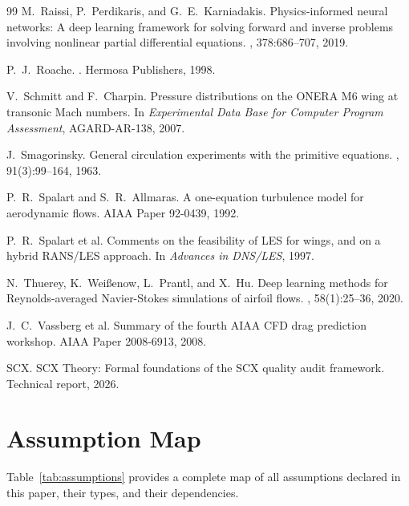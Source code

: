 \documentclass[11pt,a4paper]{article}
\theoremstyle{definition}
\theoremstyle{remark}
\begin{document}
\begin{thebibliography}{99}
M.~Raissi, P.~Perdikaris, and G.~E.~Karniadakis.
\newblock Physics-informed neural networks: A deep learning framework for solving forward and inverse problems involving nonlinear partial differential equations.
, 378:686--707, 2019.

P.~J.~Roache.
.
\newblock Hermosa Publishers, 1998.

V.~Schmitt and F.~Charpin.
\newblock Pressure distributions on the ONERA M6 wing at transonic Mach numbers.
\newblock In {\em Experimental Data Base for Computer Program Assessment}, AGARD-AR-138, 2007.

J.~Smagorinsky.
\newblock General circulation experiments with the primitive equations.
, 91(3):99--164, 1963.

P.~R.~Spalart and S.~R.~Allmaras.
\newblock A one-equation turbulence model for aerodynamic flows.
\newblock AIAA Paper 92-0439, 1992.

P.~R.~Spalart et al.
\newblock Comments on the feasibility of LES for wings, and on a hybrid RANS/LES approach.
\newblock In {\em Advances in DNS/LES}, 1997.

N.~Thuerey, K.~Weißenow, L.~Prantl, and X.~Hu.
\newblock Deep learning methods for Reynolds-averaged Navier-Stokes simulations of airfoil flows.
, 58(1):25--36, 2020.

J.~C.~Vassberg et al.
\newblock Summary of the fourth AIAA CFD drag prediction workshop.
\newblock AIAA Paper 2008-6913, 2008.

SCX.
\newblock SCX Theory: Formal foundations of the SCX quality audit framework.
\newblock Technical report, 2026.

\end{thebibliography}

\appendix
\section{Assumption Map}

Table~\ref{tab:assumptions} provides a complete map of all assumptions declared in this paper, their types, and their dependencies.
\end{document}
